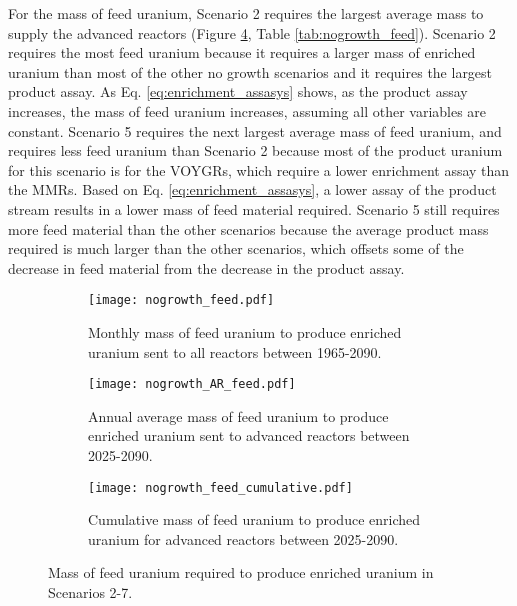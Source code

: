 For the mass of feed uranium, Scenario 2 requires the largest average mass 
to supply the advanced reactors (Figure \ref{fig:nogrowth_feed}, Table 
\ref{tab:nogrowth_feed}). Scenario 2 requires the most feed uranium 
because it requires a larger mass of enriched uranium than most 
of the other no growth scenarios and it requires the largest product 
assay. As Eq. \ref{eq:enrichment_assasys} shows, as the product assay 
increases, the mass of feed uranium increases, assuming all other 
variables are constant. Scenario 5 requires the next largest average 
mass of feed uranium, and requires less feed uranium than Scenario 2 
because 
most of the product uranium for this scenario is for the VOYGRs, which 
require a lower enrichment assay than the \glspl{MMR}. Based on Eq. 
\ref{eq:enrichment_assasys}, a lower assay of the product stream results in 
a lower mass of feed material required. Scenario 5 still requires more feed 
material than the other scenarios because the average product mass required 
is much larger than the other scenarios, which offsets some of the decrease 
in feed material from the decrease in the product assay. 

\begin{figure}
    \centering
    \begin{subfigure}[b]{0.45\textwidth}
        \centering
        \texttt{[image: nogrowth\_feed.pdf]}
        \caption{Monthly mass of feed uranium to produce enriched uranium sent to 
        all reactors between 1965-2090.}
        \label{fig:nogrowth_all_feed}
    \end{subfigure}
    \hfill
    \begin{subfigure}[b]{0.45\textwidth}
        \centering
        \texttt{[image: nogrowth\_AR\_feed.pdf]}
        \caption{Annual average mass of feed uranium to produce enriched uranium sent to 
        advanced reactors between 2025-2090.}
        \label{fig:nogrowth_AR_feed}
    \end{subfigure}
    \begin{subfigure}[b]{0.45\textwidth}
        \centering
        \texttt{[image: nogrowth\_feed\_cumulative.pdf]}
        \caption{Cumulative mass of feed uranium to produce enriched 
        uranium for advanced reactors between 2025-2090.}
        \label{fig:nogrowth_feed_cumulative}
    \end{subfigure}
       \caption{Mass of feed uranium required to produce enriched uranium
        in Scenarios 2-7.}
       \label{fig:nogrowth_feed}
\end{figure}

